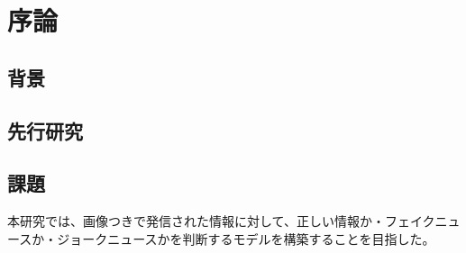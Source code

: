 \chapter{序論}
%
\section{背景}


\section{先行研究}


\section{課題}


本研究では、画像つきで発信された情報に対して、正しい情報か・フェイクニュースか・ジョークニュースかを判断するモデルを構築することを目指した。


% 
